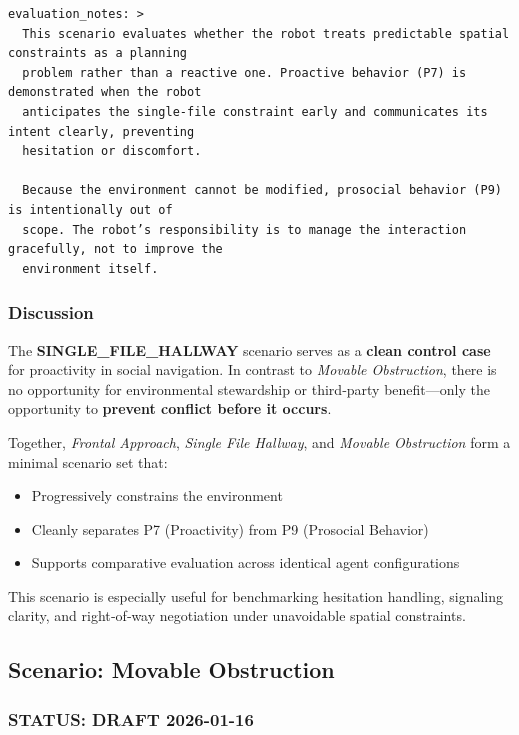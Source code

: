 \documentclass[utf8]{frontiers_suppmat} %
\providecommand{\tightlist}{%
  \setlength{\itemsep}{0pt}\setlength{\parskip}{0pt}}
\begin{document}
\begin{lstlisting}[style=literatecard, label={scenario:single}]
evaluation_notes: >
  This scenario evaluates whether the robot treats predictable spatial constraints as a planning
  problem rather than a reactive one. Proactive behavior (P7) is demonstrated when the robot
  anticipates the single-file constraint early and communicates its intent clearly, preventing
  hesitation or discomfort.

  Because the environment cannot be modified, prosocial behavior (P9) is intentionally out of
  scope. The robot’s responsibility is to manage the interaction gracefully, not to improve the
  environment itself.
\end{lstlisting}

\subsubsection{Discussion}\label{discussion}

The \textbf{SINGLE\_FILE\_HALLWAY} scenario serves as a \textbf{clean
control case} for proactivity in social navigation. In contrast to
\emph{Movable Obstruction}, there is no opportunity for environmental
stewardship or third‑party benefit---only the opportunity to
\textbf{prevent conflict before it occurs}.

Together, \emph{Frontal Approach}, \emph{Single File Hallway}, and
\emph{Movable Obstruction} form a minimal scenario set that:

\begin{itemize}
\tightlist
\item
  Progressively constrains the environment
\item
  Cleanly separates P7 (Proactivity) from P9 (Prosocial Behavior)
\item
  Supports comparative evaluation across identical agent configurations
\end{itemize}

This scenario is especially useful for benchmarking hesitation handling,
signaling clarity, and right‑of‑way negotiation under unavoidable
spatial constraints.


\subsection{Scenario: Movable
Obstruction}\label{scenario-movable-obstruction}

\subsubsection{STATUS: DRAFT 2026-01-16}\label{status-draft-2026-01-16}
\end{document}
